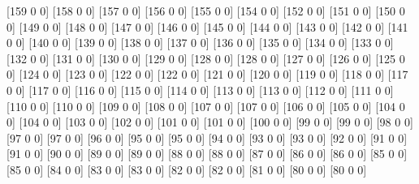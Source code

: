 [159   0   0]
[158   0   0]
[157   0   0]
[156   0   0]
[155   0   0]
[154   0   0]
[152   0   0]
[151   0   0]
[150   0   0]
[149   0   0]
[148   0   0]
[147   0   0]
[146   0   0]
[145   0   0]
[144   0   0]
[143   0   0]
[142   0   0]
[141   0   0]
[140   0   0]
[139   0   0]
[138   0   0]
[137   0   0]
[136   0   0]
[135   0   0]
[134   0   0]
[133   0   0]
[132   0   0]
[131   0   0]
[130   0   0]
[129   0   0]
[128   0   0]
[128   0   0]
[127   0   0]
[126   0   0]
[125   0   0]
[124   0   0]
[123   0   0]
[122   0   0]
[122   0   0]
[121   0   0]
[120   0   0]
[119   0   0]
[118   0   0]
[117   0   0]
[117   0   0]
[116   0   0]
[115   0   0]
[114   0   0]
[113   0   0]
[113   0   0]
[112   0   0]
[111   0   0]
[110   0   0]
[110   0   0]
[109   0   0]
[108   0   0]
[107   0   0]
[107   0   0]
[106   0   0]
[105   0   0]
[104   0   0]
[104   0   0]
[103   0   0]
[102   0   0]
[101   0   0]
[101   0   0]
[100   0   0]
[99  0  0]
[99  0  0]
[98  0  0]
[97  0  0]
[97  0  0]
[96  0  0]
[95  0  0]
[95  0  0]
[94  0  0]
[93  0  0]
[93  0  0]
[92  0  0]
[91  0  0]
[91  0  0]
[90  0  0]
[89  0  0]
[89  0  0]
[88  0  0]
[88  0  0]
[87  0  0]
[86  0  0]
[86  0  0]
[85  0  0]
[85  0  0]
[84  0  0]
[83  0  0]
[83  0  0]
[82  0  0]
[82  0  0]
[81  0  0]
[80  0  0]
[80  0  0]
